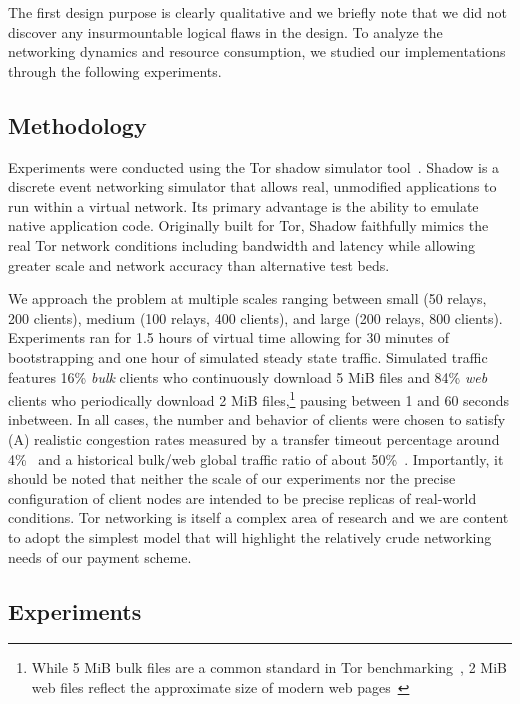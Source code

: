 The first design purpose is clearly qualitative and we briefly note that we did
not discover any insurmountable logical flaws in the design. To analyze the
networking dynamics and resource consumption, we studied our implementations
through the following experiments.

\subsection{Methodology}

Experiments were conducted using the Tor shadow simulator
tool~\cite{jansen2011shadow}. Shadow is a discrete event networking simulator
that allows real, unmodified applications to run within a virtual network. Its
primary advantage is the ability to emulate native application code. Originally
built for Tor, Shadow faithfully mimics the real Tor network conditions
including bandwidth and latency while allowing greater scale and network
accuracy than alternative test beds.

We approach the problem at multiple scales ranging between small (50 relays, 200
clients), medium (100 relays, 400 clients), and large (200 relays, 800
clients). Experiments ran for 1.5 hours of virtual time allowing for 30 minutes
of bootstrapping and one hour of simulated steady state traffic. Simulated
traffic features 16\% \emph{bulk} clients who continuously download 5 MiB files
and 84\% \emph{web} clients who periodically download 2 MiB
files,\footnote{While 5 MiB bulk files are a common standard in Tor
  benchmarking~\cite{portal2018tormetrics}, 2 MiB web files reflect the
  approximate size of modern web pages~\cite{team2018httparchive}} pausing
between 1 and 60 seconds inbetween. In all cases, the number and behavior of
clients were chosen to satisfy (A) realistic congestion rates measured by a
transfer timeout percentage around 4\%~\cite{portal2018tormetrics} and a historical
bulk/web global traffic ratio of about 50\%~\cite{chaabane2010digging,
  mccoy2008shining}. Importantly, it should be noted that neither the scale of
our experiments nor the precise configuration of client nodes are intended to be
precise replicas of real-world conditions. Tor networking is itself a complex
area of research and we are content to adopt the simplest model that will
highlight the relatively crude networking needs of our payment scheme.

\subsection{Experiments}

